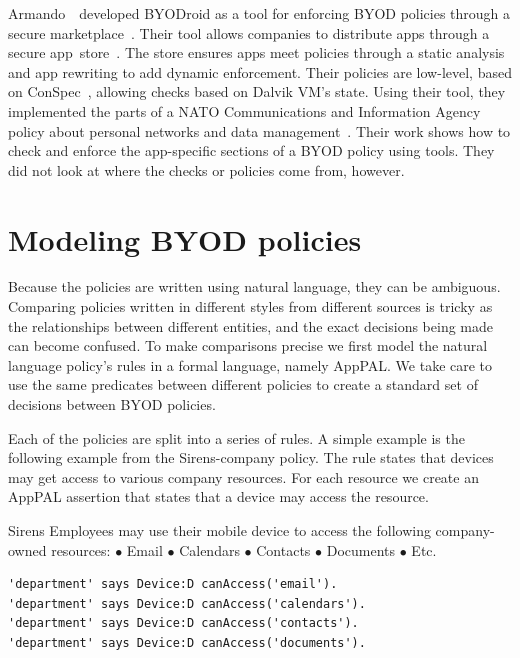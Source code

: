 \documentclass[thesis.tex]{subfiles}
\begin{document}
Armando~\etal~developed BYODroid as a tool for enforcing BYOD policies through a
secure marketplace~\cite{armando_bring_2013}. Their tool allows companies to
distribute apps through a secure app~store~\cite{armando_enabling_2014}. The
store ensures apps meet policies through a static analysis and
app rewriting to add dynamic enforcement. Their policies are low-level, based on
ConSpec~\cite{aktug_conspec_2008}, allowing checks based on Dalvik VM's state.
Using their tool, they implemented the parts of a NATO Communications and
Information Agency policy about personal networks and data
management~\cite{armando_developing_2016}. Their work shows how to check and enforce the app-specific
sections of a BYOD policy using tools. They did not
look at where the checks or policies come from, however.


\section{Modeling BYOD policies}

Because the policies are written using natural language, they can be ambiguous.
Comparing policies written in different styles from different sources is tricky
as the relationships between different entities, and the exact decisions being
made can become confused. To make comparisons precise we first model the
natural language policy's rules in a formal language, namely AppPAL. We take
care to use the same predicates between different policies to create a standard
set of decisions between \ac{BYOD} policies.

Each of the policies are split into a series of rules. A simple example is the
following example from the Sirens-company policy. The rule states that devices
may get access to various company resources.
For each resource we create an AppPAL
assertion that states that a device may access the resource.

\begin{policyrule}{Sirens}
  Employees may use their mobile device to access the following company-owned resources:
  \newline $\bullet$ Email $\bullet$ Calendars $\bullet$ Contacts $\bullet$ Documents $\bullet$ Etc.
  \normalfont
  \begin{lstlisting}
'department' says Device:D canAccess('email').
'department' says Device:D canAccess('calendars').
'department' says Device:D canAccess('contacts').
'department' says Device:D canAccess('documents').
  \end{lstlisting}
\end{policyrule}
\end{document}
